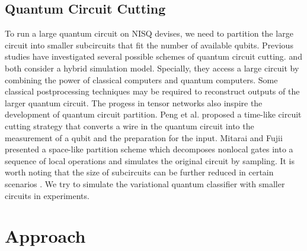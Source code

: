 \documentclass[sigconf]{acmart}
\begin{document}
\subsection{Quantum Circuit Cutting}
To run a large quantum circuit on NISQ devises, we need to partition the large circuit into smaller subcircuits that fit the number of available qubits. Previous studies have investigated several possible schemes of quantum circuit cutting. \cite{bravyi2016} and \cite{tang2021} both consider a hybrid simulation model. Specially, they access a large circuit by combining the power of classical computers and quantum computers. Some classical postprocessing techniques may be required to reconstruct outputs of the larger quantum circuit. The progess in tensor networks also inspire the development of quantum circuit partition. Peng et al. \cite{peng2020} proposed a time-like circuit cutting strategy that converts a wire in the quantum circuit into the measurement of a qubit and the preparation for the input. Mitarai and Fujii \cite{mitarai2021} presented a space-like partition scheme which decomposes nonlocal gates into a sequence of local operations and simulates the original circuit by sampling. It is worth noting that the size of subcircuits can be further reduced in certain scenarios \cite{marshall2022}. We try to simulate the variational quantum classifier with smaller circuits in experiments.

\section{Approach}
\end{document}
